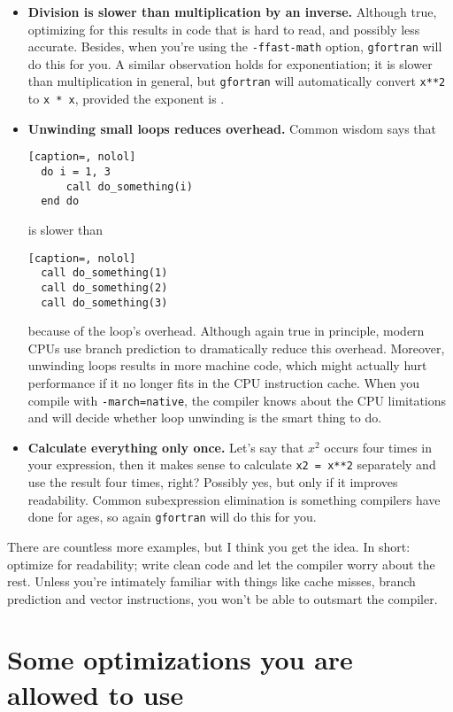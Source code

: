 \begin{itemize}
  \item\textbf{Division is slower than multiplication by an inverse.} Although true, optimizing for this results in code that is hard to read, and possibly less accurate.
    Besides, when you're using the \texttt{-ffast-math} option, \texttt{gfortran} will do this for you.
    A similar observation holds for exponentiation; it is slower than multiplication in general, but \texttt{gfortran} will automatically convert \texttt{x**2} to \texttt{x * x}, provided the exponent is . \newpage
  \item\textbf{Unwinding small loops reduces overhead.} Common wisdom says that
\begin{lstlisting}[caption=, nolol]
  do i = 1, 3
      call do_something(i)
  end do
\end{lstlisting}
    is slower than
\begin{lstlisting}[caption=, nolol]
  call do_something(1)
  call do_something(2)
  call do_something(3)
\end{lstlisting}
    because of the loop's overhead.
    Although again true in principle, modern CPUs use branch prediction to dramatically reduce this overhead.
    Moreover, unwinding loops results in more machine code, which might actually hurt performance if it no longer fits in the CPU instruction cache.
    When you compile with \texttt{-march=native}, the compiler knows about the CPU limitations and will decide whether loop unwinding is the smart thing to do.
  \item\textbf{Calculate everything only once.} Let's say that $x^2$ occurs four times in your expression, then it makes sense to calculate \texttt{x2 = x**2} separately and use the result four times, right? Possibly yes, but only if it improves readability.
    Common subexpression elimination is something compilers have done for ages, so again \texttt{gfortran} will do this for you.
\end{itemize}
There are countless more examples, but I think you get the idea.
In short: optimize for readability; write clean code and let the compiler worry about the rest.
Unless you're intimately familiar with things like cache misses, branch prediction and vector instructions, you won't be able to outsmart the compiler.

\section{Some optimizations you are allowed to use}

